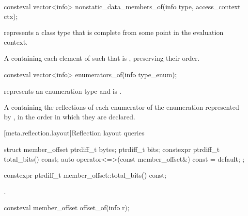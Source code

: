 %
\begin{itemdecl}
consteval vector<info> nonstatic_data_members_of(info type, access_context ctx);
\end{itemdecl}

\begin{itemdescr}
\pnum
\constantwhen
{} represents a class type
that is complete from some point in the evaluation context.

\pnum
\returns
A  containing each element  of 
such that  is ,
preserving their order.
\end{itemdescr}

%
\begin{itemdecl}
consteval vector<info> enumerators_of(info type_enum);
\end{itemdecl}

\begin{itemdescr}
\pnum
\constantwhen
{} represents an enumeration type
and  is .

\pnum
\returns
A  containing the reflections of each enumerator
of the enumeration represented by ,
in the order in which they are declared.
\end{itemdescr}

[meta.reflection.layout]{Reflection layout queries}

%
%
\begin{itemdecl}
struct member_offset {
  ptrdiff_t bytes;
  ptrdiff_t bits;
  constexpr ptrdiff_t total_bits() const;
  auto operator<=>(const member_offset&) const = default;
};

constexpr ptrdiff_t member_offset::total_bits() const;
\end{itemdecl}

\begin{itemdescr}
\pnum
\returns
{}.
\end{itemdescr}

%
\begin{itemdecl}
consteval member_offset offset_of(info r);
\end{itemdecl}

